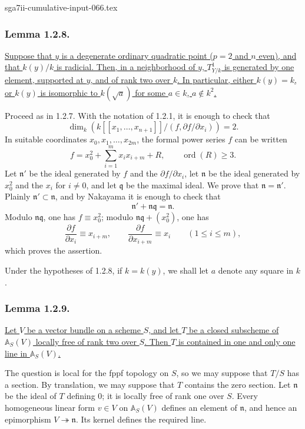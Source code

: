 \begin{filecontents*}{sga7ii-cumulative-input-066.tex}
\subsubsection*{Lemma 1.2.8.}
\underline{Suppose that $y$ is a degenerate ordinary quadratic point
($p=2$ and $n$ even), and that $k(y)/k$ is radicial.  Then, in a
neighborhood of $y$, $T^1_{Y/k}$ is generated by one element,
supported at $y$, and of rank two over $k$.  In particular, either
$k(y)=k$, or $k(y)$ is isomorphic to $k(\sqrt a)$ for some
$a\in k$, $a\notin k^2$.}

Proceed as in 1.2.7.  With the notation of 1.2.1, it is enough to
check that
\[
\dim_k\left(
k[[x_1,\ldots,x_{n+1}]]\big/
  (f,\partial f/\partial x_i)
\right)=2.
\]
In suitable coordinates $x_0,x_1,\ldots,x_{2m}$, the formal power
series $f$ can be written
\[
f=x_0^2+\sum_{i=1}^m x_ix_{i+m}+R,
\qquad\operatorname{ord}(R)\geq3.
\]
Let $\mathfrak n'$ be the ideal generated by $f$ and the
$\partial f/\partial x_i$, let $\mathfrak n$ be the ideal generated
by $x_0^2$ and the $x_i$ for $i\ne0$, and let $\mathfrak q$ be the
maximal ideal.  We prove that $\mathfrak n=\mathfrak n'$.  Plainly
$\mathfrak n'\subset\mathfrak n$, and by Nakayama it is enough to
check that
\[
\mathfrak n'+\mathfrak n\mathfrak q=\mathfrak n.
\]
Modulo $\mathfrak n\mathfrak q$, one has $f\equiv x_0^2$; modulo
$\mathfrak n\mathfrak q+(x_0^2)$, one has
\[
\frac{\partial f}{\partial x_i}\equiv x_{i+m},
\qquad
\frac{\partial f}{\partial x_{i+m}}\equiv x_i
\qquad(1\leq i\leq m),
\]
which proves the assertion.

Under the hypotheses of 1.2.8, if $k=k(y)$, we shall let $a$ denote
any square in $k$.

\subsubsection*{Lemma 1.2.9.}
\underline{Let $V$ be a vector bundle on a scheme $S$, and let $T$
be a closed subscheme of $\mathbb A_S(V)$ locally free of rank two
over $S$.  Then $T$ is contained in one and only one line in
$\mathbb A_S(V)$.}

The question is local for the fppf topology on $S$, so we may suppose
that $T/S$ has a section.  By translation, we may suppose that $T$
contains the zero section.  Let $\mathfrak n$ be the ideal of $T$
defining $0$; it is locally free of rank one over $S$.  Every
homogeneous linear form $v\in V$ on $\mathbb A_S(V)$ defines an
element of $\mathfrak n$, and hence an epimorphism
$V\twoheadrightarrow\mathfrak n$.  Its kernel defines the required
line.


\end{filecontents*}
